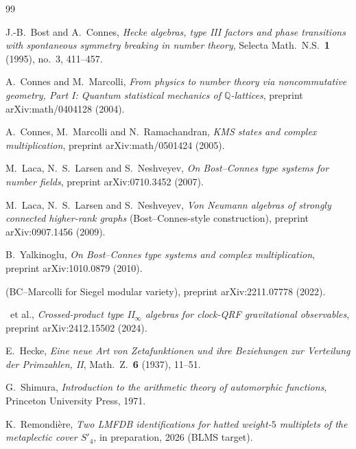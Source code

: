 \documentclass[12pt]{amsart}
\theoremstyle{definition}
\newcommand{\Q}{\mathbb{Q}}
\newcommand{\DEHK}{\mathrm{DEHK}}
\begin{document}
\begin{thebibliography}{99}

 J.-B.~Bost and A.~Connes, \emph{Hecke algebras,
type III factors and phase transitions with spontaneous symmetry
breaking in number theory}, Selecta Math.\ N.S.\ \textbf{1} (1995),
no.~3, 411--457.

 A.~Connes and M.~Marcolli, \emph{From physics to
number theory via noncommutative geometry, Part I: Quantum
statistical mechanics of $\Q$-lattices}, preprint arXiv:math/0404128
(2004).

 A.~Connes, M.~Marcolli and N.~Ramachandran,
\emph{KMS states and complex multiplication}, preprint
arXiv:math/0501424 (2005).

 M.~Laca, N.~S.~Larsen and S.~Neshveyev,
\emph{On Bost--Connes type systems for number fields}, preprint
arXiv:0710.3452 (2007).

 M.~Laca, N.~S.~Larsen and S.~Neshveyev,
\emph{Von Neumann algebras of strongly connected higher-rank
graphs} (Bost--Connes-style construction), preprint arXiv:0907.1456
(2009).

 B.~Yalkinoglu, \emph{On Bost--Connes type
systems and complex multiplication}, preprint arXiv:1010.0879
(2010).

 (BC--Marcolli for Siegel modular variety),
preprint arXiv:2211.07778 (2022).

 \DEHK\ et al., \emph{Crossed-product type
II${}_\infty$ algebras for clock-QRF gravitational observables},
preprint arXiv:2412.15502 (2024).

 E.~Hecke, \emph{Eine neue Art von Zetafunktionen
und ihre Beziehungen zur Verteilung der Primzahlen, II}, Math.\
Z.\ \textbf{6} (1937), 11--51.

 G.~Shimura, \emph{Introduction to the
arithmetic theory of automorphic functions}, Princeton University
Press, 1971.

 K.~Remondi\`ere, \emph{Two LMFDB
identifications for hatted weight-$5$ multiplets of the
metaplectic cover $S'_4$}, in preparation, 2026 (BLMS target).

\end{thebibliography}
\end{document}
